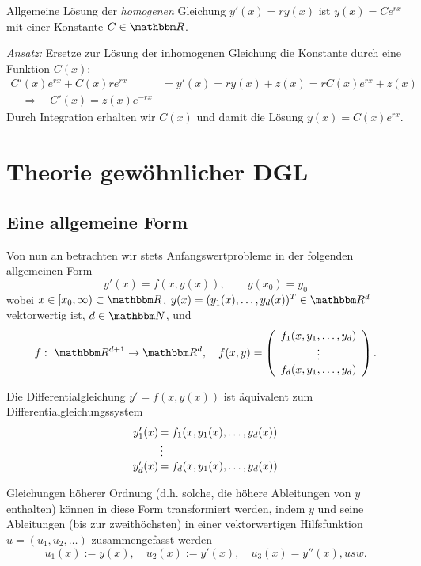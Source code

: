 \documentclass[12pt,a4paper]{book}
\theoremstyle{break}
\theoremstyle{nonumberplain}
\newcommand{\N}{\mathbbm N}
\newcommand{\R}{\mathbbm R}
\newcommand{\1}{\mathbbm{1}} 			      	%
\begin{document}
Allgemeine Lösung der \emph{homogenen} Gleichung $y'(x)=r y(x)$ ist $y(x)=C e^{rx}$ mit einer Konstante $C\in \R$.

\emph{Ansatz:} Ersetze zur Lösung der inhomogenen Gleichung die Konstante durch eine Funktion $C(x)$:
\begin{align*}
C'(x) e^{rx} + C(x) r e^{rx}& =y'(x)= r y(x) + z(x)= r C(x) e^{rx} + z(x)\\
\quad \Longrightarrow \quad C'(x)= z(x) e^{-rx} 
\end{align*}
Durch Integration erhalten wir $C(x)$ und damit die Lösung $y(x)=C(x)e^{rx}$.



\section{Theorie gewöhnlicher DGL}

\subsection{Eine allgemeine Form}

Von nun an betrachten wir stets Anfangswertprobleme in der folgenden allgemeinen Form
\[
y'(x)=f(x,y(x)), \qquad y(x_0)=y_0
\]
wobei $x\in [x_0,\infty)\subset \R$, $y(x)=(y_1(x),\ldots, y_d(x))^T\in \R^d$ vektorwertig ist, $d\in \N$, und
\[
f:\ \R^{d+1}\to \R^d, \quad f(x,y)=\left( \begin{array}{c} f_1(x,y_1,\ldots,y_d)\\ \vdots \\ f_d(x,y_1,\ldots,y_d) \end{array} \right).
\]

Die Differentialgleichung $y'=f(x,y(x))$ ist äquivalent zum Differentialgleichungssystem
\[
\left. \begin{array}{r@{\,} l} 
y'_1(x) &= f_1(x,y_1(x),\ldots,y_d(x))\\ 
&\vdots\\
y'_d(x) &= f_d(x,y_1(x),\ldots,y_d(x))
\end{array}\right.
\]
 
Gleichungen höherer Ordnung (d.h. solche, die höhere Ableitungen von $y$ enthalten) können 
in diese Form transformiert werden, indem $y$ und seine Ableitungen (bis zur zweithöchsten) in
einer vektorwertigen Hilfsfunktion  $u=(u_1,u_2,\ldots)$ zusammengefasst werden
\[
u_1(x):=y(x), \quad u_2(x):=y'(x), \quad u_3(x)=y''(x), usw.
\]
\end{document}
